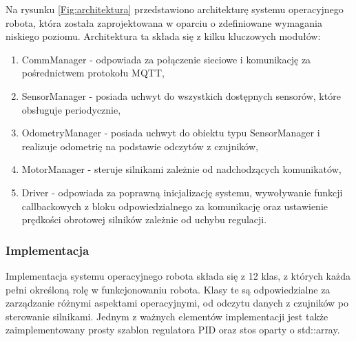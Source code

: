 \documentclass[12pt,twoside]{article}
\begin{document}
Na rysunku \ref{Fig:architektura} przedstawiono architekturę systemu operacyjnego robota, która została zaprojektowana w oparciu o zdefiniowane wymagania niskiego poziomu. Architektura ta składa się z kilku kluczowych modułów:

\begin{enumerate}[label=\alph*), leftmargin=1.25cm]
	\item CommManager - odpowiada za połączenie sieciowe i komunikację za pośrednictwem protokołu MQTT,
	\item SensorManager - posiada uchwyt do wszystkich dostępnych sensorów, które obsługuje periodycznie,
	\item OdometryManager - posiada uchwyt do obiektu typu SensorManager i realizuje odometrię na podstawie odczytów z czujników,
	\item MotorManager - steruje silnikami zależnie od nadchodzących komunikatów,
	\item Driver - odpowiada za poprawną inicjalizację systemu, wywoływanie funkcji callbackowych z bloku odpowiedzialnego za komunikację oraz ustawienie prędkości obrotowej silników zależnie od uchybu regulacji.  
\end{enumerate}

\subsubsection{Implementacja}
Implementacja systemu operacyjnego robota składa się z 12 klas, z których każda pełni określoną rolę w funkcjonowaniu robota. Klasy te są odpowiedzialne za zarządzanie różnymi aspektami operacyjnymi, od odczytu danych z czujników po sterowanie silnikami. Jednym z ważnych elementów implementacji jest także zaimplementowany prosty szablon regulatora PID oraz stos oparty o std::array\cite{stdarray}.
\end{document}
